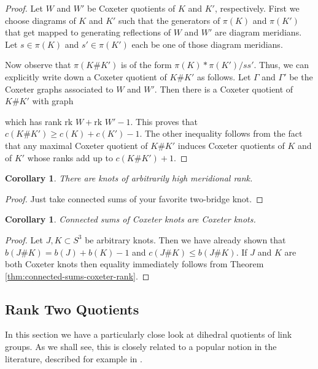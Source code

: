 \documentclass{article}
\newtheorem{corollary}[theorem]{Corollary}
\theoremstyle{definition}
\begin{document}
\begin{proof}
Let $W$ and $W'$ be Coxeter quotients of $K$ and $K'$, respectively. First we choose diagrams of $K$ and $K'$ such that the generators of $\pi(K)$ and $\pi(K')$ that get mapped to generating reflections of $W$ and $W'$ are diagram meridians. Let $s \in \pi(K)$ and $s' \in \pi(K')$ each be one of those diagram meridians.

Now observe that $\pi(K\#K')$ is of the form $\pi(K) * \pi(K') / ss'$. Thus, we can explicitly write down a Coxeter quotient of $K\#K'$ as follows. Let $\Gamma$ and $\Gamma'$ be the Coxeter graphs associated to $W$ and $W'$. Then there is a Coxeter quotient of $K\#K'$ with graph
\begin{center}
\end{center}
which has rank $\text{rk } W + \text{rk } W' - 1$. This proves that $c(K\#K') \geq c(K) + c(K') -1$. The other inequality follows from the fact that any maximal Coxeter quotient of $K\#K'$ induces Coxeter quotients of $K$ and of $K'$ whose ranks add up to $c(K\#K') + 1$.
\end{proof}

\begin{corollary}
There are knots of arbitrarily high meridional rank.
\end{corollary}

\begin{proof}
Just take connected sums of your favorite two-bridge knot.
\end{proof}

\begin{corollary}
Connected sums of Coxeter knots are Coxeter knots.
\end{corollary}

\begin{proof}
Let $J, K \subset S^3$ be arbitrary knots. Then we have already shown that $b(J\#K) = b(J) + b(K) - 1$ and $c (J\#K) \leq b(J\#K)$. If $J$ and $K$ are both Coxeter knots then equality immediately follows from Theorem \ref{thm:connected-sums-coxeter-rank}.
\end{proof}

\subsection{Rank Two Quotients}\label{subsec:rank-two}
In this section we have a particularly close look at dihedral quotients of link groups. As we shall see, this is closely related to a popular notion in the literature, described for example in \cite{przytycki1998}. 
\end{document}
